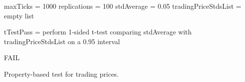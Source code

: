 \begin{algorithm}
maxTicks = 1000\;
replications = 100\;
stdAverage = 0.05\;
tradingPriceStdsList = empty list\;


tTestPass = perform 1-sided t-test comparing stdAverage with tradingPriceStdsList on a 0.95 interval\;

 {
  FAIL\;
}
\caption{Property-based test for trading prices.}
\label{alg:prop_test_trading}
\end{algorithm}